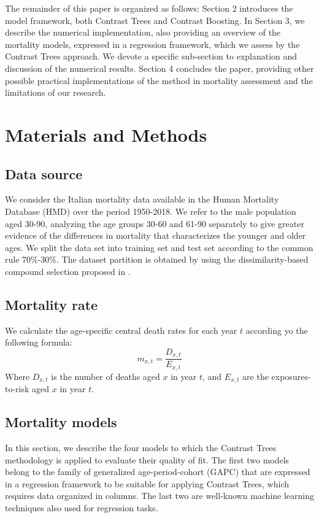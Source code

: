 \documentclass[fleqn,10pt]{wlscirep}
\begin{document}
The remainder of this paper is organized as follows: Section 2 introduces the model framework, both Contrast Trees and Contrast Boosting. 
In Section 3, we describe the numerical implementation, also providing an overview of the mortality models, expressed in a regression framework, which we assess by the Contrast Trees approach. We devote a specific sub-section to explanation and discussion of the numerical results. 
Section 4 concludes the paper, providing other possible practical implementations of the method in mortality assessment and the limitations of our research.

\section*{Materials and Methods}

\subsection*{Data source}

We consider the Italian mortality data available in the Human Mortality Database (HMD) over the period 1950-2018. We refer to the male population aged 30-90, analyzing the age groups 30-60 and 61-90 separately to give greater evidence of the differences in mortality that characterizes the younger and older ages.
We split the data set into training set and test set according to the common rule 70\%-30\%. The dataset partition is obtained by using the dissimilarity-based compound selection proposed in \cite{Willett1999}.

\subsection*{Mortality rate}
We calculate the age-specific central death rates for each year $t$ according yo the following formula:
\begin{equation} 
\label{eq:mxt}
m_{x,t}=\frac{D_{x,t}}{E_{x,t}}
\end{equation}
Where $D_{x,t}$ is the number of deaths aged $x$ in year $t$, and $E_{x,t}$ are the exposures-to-risk aged $x$ in year $t$.

\subsection*{Mortality models}
In this section, we describe the four models to which the Contrast Trees methodology is applied to evaluate their quality of fit.
The first two models belong to the family of generalized age-period-cohort (GAPC) that are expressed in a regression framework to be suitable for applying Contrast Trees, which requires data organized in columns. The last two are well-known machine learning techniques also used for regression tasks.
\end{document}
